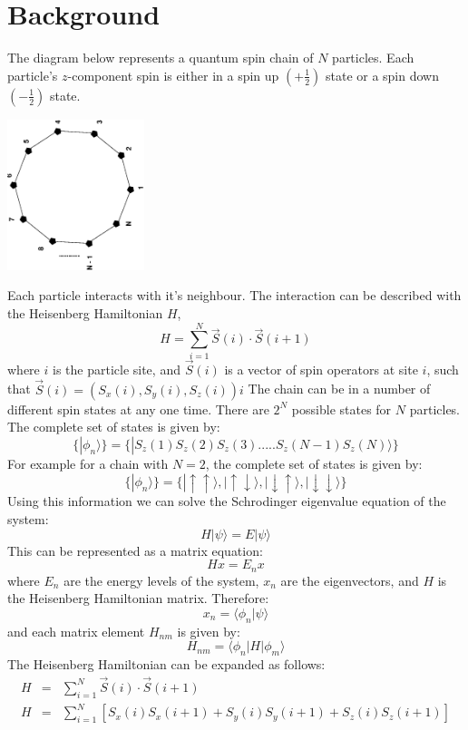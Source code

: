 \documentclass[a4paper]{IEEEtran}
\begin{document}
\section{Background}
    The diagram below represents a quantum spin chain of $N$ particles.
    Each particle's $z$-component spin is either in a 
    spin up $\left(+\frac{1}{2}\right)$ state or
    a spin down $\left(-\frac{1}{2}\right)$ state.
    \begin{center}
        \includegraphics[angle=-90, width=4cm]{chain.eps}
    \end{center}
    Each particle interacts with it's neighbour. The interaction can be described
    with the Heisenberg Hamiltonian $H$,
        \[ H = \sum_{i = 1}^{N} \vec{S}(i) \cdot \vec{S}(i+1) \]
    where $i$ is the particle site, and $\vec{S}(i)$ is a vector of spin
    operators at site $i$, such that
        $\vec{S}(i) = (S_x(i), S_y(i), S_z(i) ) i$
    The chain can be in a number of different spin states at any one time. There
    are $2^N$ possible states for $N$ particles. The complete set of states 
    is given by:
        \[ \{| \phi_n \rangle \} = \{ | S_z(1)S_z(2)S_z(3).....S_z(N-1)S_z(N) \rangle \} \]
    For example for a chain with $N=2$, the complete set of states is given by:
        \[ \{|\phi_n\rangle\} = \{ |\uparrow \uparrow \rangle,
                                   |\uparrow \downarrow \rangle,
                                   |\downarrow \uparrow \rangle,
                                   |\downarrow \downarrow \rangle\}\]
    Using this information we can solve the Schrodinger eigenvalue equation of the
    system:
        \[ H|\psi\rangle = E|\psi\rangle\]
    This can be represented as a matrix equation:
        \[ Hx = E_n x\]
    where $E_n$ are the energy levels of the system, $x_n$ are the eigenvectors,
    and $H$ is the Heisenberg Hamiltonian matrix. Therefore:
        \[ x_n = \langle \phi_n | \psi \rangle \]
    and each matrix element $H_{nm}$ is given by:
        \[ H_{nm} = \langle \phi_n | H | \phi_m \rangle \]
    The Heisenberg Hamiltonian can be expanded as follows:
    \begin{eqnarray*}
    H & = & \sum_{i = 1}^{N} \vec{S}(i) \cdot \vec{S}(i+1) \\ 
    H & = & \sum_{i = 1}^{N} \left[ S_x(i)S_x(i+1) +
                                    S_y(i)S_y(i+1) +
                                    S_z(i)S_z(i+1) \right] \\
    \end{eqnarray*}
\end{document}

